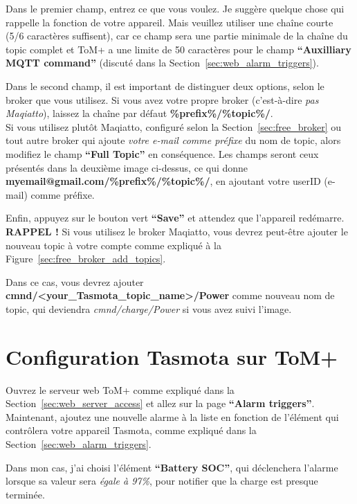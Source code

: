 Dans le premier champ, entrez ce que vous voulez. Je suggère quelque chose qui rappelle la
fonction de votre appareil. Mais veuillez utiliser une chaîne courte (5/6 caractères suffisent), car ce
champ sera une partie minimale de la chaîne du topic complet et ToM+ a une limite de 50 caractères
pour le champ \textbf{“Auxilliary MQTT command”} (discuté dans la Section~\ref{sec:web_alarm_triggers}).

Dans le second champ, il est important de distinguer deux options, selon le
broker que vous utilisez. Si vous avez votre propre broker (c'est-à-dire \textit{pas Maqiatto}),
laissez la chaîne par défaut \textbf{\%prefix\%/\%topic\%/}.\\

Si vous utilisez plutôt Maqiatto, configuré selon la Section~\ref{sec:free_broker} ou 
tout autre broker qui ajoute \textit{votre e-mail comme préfixe} du nom de topic, alors
modifiez le champ \textbf{“Full Topic”} en conséquence. \linebreak Les champs seront ceux présentés 
dans la deuxième image ci-dessus, ce qui donne \linebreak \textbf{myemail@gmail.com/\%prefix\%/\%topic\%/},
en ajoutant votre userID (e-mail) comme préfixe.

Enfin, appuyez sur le bouton vert \textbf{“Save”} et attendez que l'appareil redémarre.\\

\textbf{RAPPEL !} Si vous utilisez le broker Maqiatto, vous devrez peut-être ajouter le nouveau topic
à votre compte comme expliqué à la Figure~\ref{sec:free_broker_add_topics}.

Dans ce cas, vous devrez ajouter \textbf{cmnd/<your\_Tasmota\_topic\_name>/Power} comme nouveau nom de topic,
qui deviendra \textit{cmnd/charge/Power} si vous avez suivi l'image.


\section{Configuration Tasmota sur ToM+}

Ouvrez le serveur web ToM+ comme expliqué dans la Section~\ref{sec:web_server_access} et allez sur la
page \textbf{“Alarm triggers”}. Maintenant, ajoutez une nouvelle alarme à la liste en fonction de
l'élément qui contrôlera votre appareil Tasmota, comme expliqué dans la Section~\ref{sec:web_alarm_triggers}.

Dans mon cas, j'ai choisi l'élément \textbf{“Battery SOC”}, qui déclenchera l'alarme lorsque sa
valeur sera \textit{égale à 97\%}, pour notifier que la charge est presque terminée.

